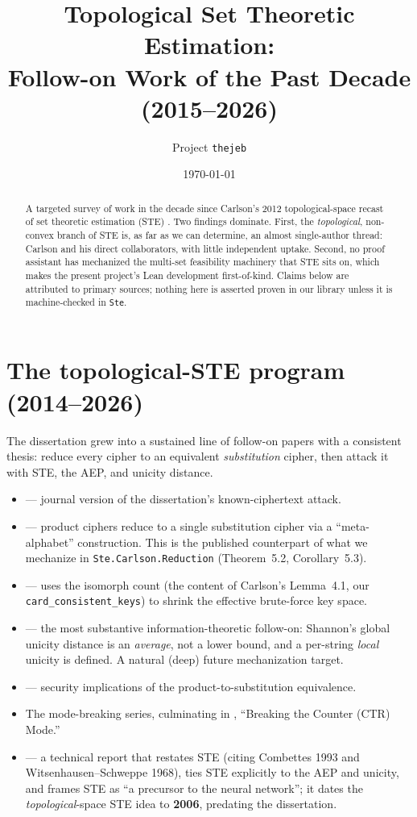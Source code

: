 \documentclass[11pt]{article}
\title{Topological Set Theoretic Estimation:\\
\large Follow-on Work of the Past Decade (2015--2026)}
\author{Project \texttt{thejeb}}
\date{\today}
\begin{document}
\maketitle

\begin{abstract}
A targeted survey of work in the decade since Carlson's 2012
topological-space recast of set theoretic estimation (STE)
\citep{carlson2012}.  Two findings dominate.  First, the
\emph{topological}, non-convex branch of STE is, as far as we can
determine, an almost single-author thread: Carlson and his direct
collaborators, with little independent uptake.  Second, no proof
assistant has mechanized the multi-set feasibility machinery that STE
sits on, which makes the present project's Lean development
first-of-kind.  Claims below are attributed to primary sources; nothing
here is asserted proven in our library unless it is machine-checked in
\texttt{Ste}.
\end{abstract}

\section{The topological-STE program (2014--2026)}
The dissertation grew into a sustained line of follow-on papers with a
consistent thesis: reduce every cipher to an equivalent \emph{substitution}
cipher, then attack it with STE, the AEP, and unicity distance.
\begin{itemize}
\item \citet{carlson2014breaking} --- journal version of the
  dissertation's known-ciphertext attack.
\item \citet{ghosh2021isomorphic} --- product ciphers reduce to a single
  substitution cipher via a ``meta-alphabet'' construction.  This is the
  published counterpart of what we mechanize in
  \texttt{Ste.Carlson.Reduction} (Theorem~5.2, Corollary~5.3).
\item \citet{carlson2021keyspace} --- uses the isomorph count (the
  content of Carlson's Lemma~4.1, our \texttt{card\_consistent\_keys}) to
  shrink the effective brute-force key space.
\item \citet{carlson2022localentropy} --- the most substantive
  information-theoretic follow-on: Shannon's global unicity distance is
  an \emph{average}, not a lower bound, and a per-string \emph{local}
  unicity is defined.  A natural (deep) future mechanization target.
\item \citet{carlson2022equivalence} --- security implications of the
  product-to-substitution equivalence.
\item The mode-breaking series, culminating in
  \citet{hiromoto2025ctr}, ``Breaking the Counter (CTR) Mode.''
\item \citet{carlson2026entropy} --- a technical report that restates STE
  (citing Combettes 1993 and Witsenhausen--Schweppe 1968), ties STE
  explicitly to the AEP and unicity, and frames STE as ``a precursor to
  the neural network''; it dates the \emph{topological}-space STE idea to
  \textbf{2006}, predating the dissertation.
\end{itemize}
\end{document}
